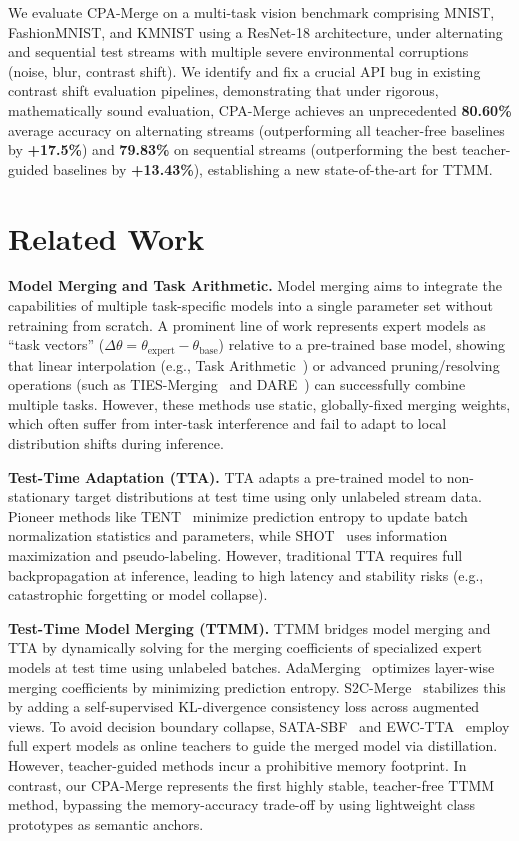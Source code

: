 \documentclass{article}
\theoremstyle{plain}
\theoremstyle{definition}
\theoremstyle{remark}
\begin{document}
We evaluate CPA-Merge on a multi-task vision benchmark comprising MNIST, FashionMNIST, and KMNIST using a ResNet-18 architecture, under alternating and sequential test streams with multiple severe environmental corruptions (noise, blur, contrast shift). We identify and fix a crucial API bug in existing contrast shift evaluation pipelines, demonstrating that under rigorous, mathematically sound evaluation, CPA-Merge achieves an unprecedented \textbf{80.60\%} average accuracy on alternating streams (outperforming all teacher-free baselines by \textbf{+17.5\%}) and \textbf{79.83\%} on sequential streams (outperforming the best teacher-guided baselines by \textbf{+13.43\%}), establishing a new state-of-the-art for TTMM.

\section{Related Work}
\label{submission-related-work}

\textbf{Model Merging and Task Arithmetic.} Model merging aims to integrate the capabilities of multiple task-specific models into a single parameter set without retraining from scratch. A prominent line of work represents expert models as ``task vectors'' ($\Delta \theta = \theta_{\text{expert}} - \theta_{\text{base}}$) relative to a pre-trained base model, showing that linear interpolation (e.g., Task Arithmetic~\cite{ilharco2023editing}) or advanced pruning/resolving operations (such as TIES-Merging~\cite{yadav2023ties} and DARE~\cite{yu2023dare}) can successfully combine multiple tasks. However, these methods use static, globally-fixed merging weights, which often suffer from inter-task interference and fail to adapt to local distribution shifts during inference.

\textbf{Test-Time Adaptation (TTA).} TTA adapts a pre-trained model to non-stationary target distributions at test time using only unlabeled stream data. Pioneer methods like TENT~\cite{wang2021tent} minimize prediction entropy to update batch normalization statistics and parameters, while SHOT~\cite{liang2020shot} uses information maximization and pseudo-labeling. However, traditional TTA requires full backpropagation at inference, leading to high latency and stability risks (e.g., catastrophic forgetting or model collapse).

\textbf{Test-Time Model Merging (TTMM).} TTMM bridges model merging and TTA by dynamically solving for the merging coefficients of specialized expert models at test time using unlabeled batches. AdaMerging~\cite{yang2024adamerging} optimizes layer-wise merging coefficients by minimizing prediction entropy. S2C-Merge~\cite{s2cmerge2026} stabilizes this by adding a self-supervised KL-divergence consistency loss across augmented views. To avoid decision boundary collapse, SATA-SBF~\cite{sata2026} and EWC-TTA~\cite{ewctta2026} employ full expert models as online teachers to guide the merged model via distillation. However, teacher-guided methods incur a prohibitive memory footprint. In contrast, our CPA-Merge represents the first highly stable, teacher-free TTMM method, bypassing the memory-accuracy trade-off by using lightweight class prototypes as semantic anchors.
\end{document}
